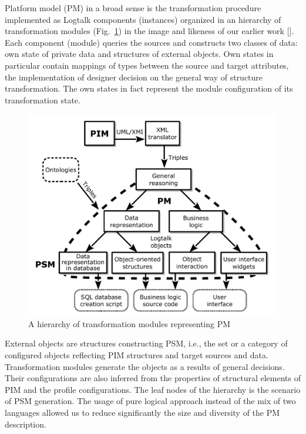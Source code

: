 \documentclass[conference,a4paper]{IEEEtran}
\begin{document}
Platform model (PM) in a broad sense is the transformation procedure implemented as Logtalk components (instances) organized in an hierarchy of transformation modules (Fig.~\ref{fig:modules}) in the image and likeness of our earlier work [].  Each component (module) queries the sources and constructs two classes of data: own state of private data and structures of external objects.  Own states in particular contain mappings of types between the source and target attributes, the implementation of designer decision on the general way of structure transformation.  The own states in fact represent the module configuration of its transformation state.

\begin{figure}[t]
  \centering
  \includegraphics[width=1\linewidth]{architect_tree_pres-en-wo-OCL.pdf}
  \caption{A hierarchy of transformation modules representing PM}
  \label{fig:modules}
\end{figure}

External objects are structures constructing PSM, i.e., the set or a category of configured objects reflecting PIM structures and target sources and data.  Transformation modules generate the objects as a results of general decisions.  Their configurations are also inferred from the properties of structural elements of PIM and the profile configurations.  The leaf nodes of the hierarchy is the scenario of PSM generation.  The usage of pure logical approach instead of the mix of two languages allowed us to reduce significantly the size and diversity of the PM description.
\end{document}

